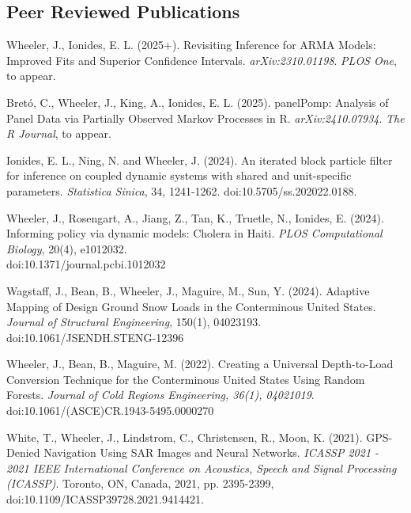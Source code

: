 \documentclass[11pt]{article}
\newenvironment {reflist}
                {
                 \begin{list}{}
                 {\setlength{\labelwidth}{0mm}
                  \setlength{\leftmargin}{8mm}
                  \setlength{\itemindent}{-3mm}
                  \setlength{\labelsep}{0mm}
                  \setlength{\parsep}{0.1 ex}
                  \setlength{\itemsep}{0.1cm}
      \setlength{\topsep}{0.15cm}}} %
   {\end{list}}
\begin{document}
\subsection*{Peer Reviewed Publications}

\begin{reflist}

    \item Wheeler, J., Ionides, E. L. (2025+). Revisiting Inference for ARMA Models: Improved Fits and Superior Confidence Intervals. {\it arXiv:2310.01198}. {\it PLOS One}, to appear.

    \item Bret\'o, C., Wheeler, J., King, A., Ionides, E. L. (2025). panelPomp: Analysis of Panel Data via Partially Observed Markov Processes in R. {\it arXiv:2410.07934}. {\it The R Journal}, to appear.

    \item Ionides, E. L., Ning, N. and Wheeler, J. (2024). An iterated block particle filter for inference on coupled dynamic systems with shared and unit-specific parameters. {\it Statistica Sinica}, 34, 1241-1262. doi:10.5705/ss.202022.0188.

    \item Wheeler, J., Rosengart, A., Jiang, Z., Tan, K., Truetle, N., Ionides, E. (2024). Informing policy via dynamic models: Cholera in Haiti. {\it PLOS Computational Biology}, 20(4), e1012032. \\ doi:10.1371/journal.pcbi.1012032

    \item Wagstaff, J., Bean, B., Wheeler, J., Maguire, M., Sun, Y. (2024). Adaptive Mapping of Design Ground Snow Loads in the Conterminous United States. {\it Journal of Structural Engineering}, 150(1), 04023193. doi:10.1061/JSENDH.STENG-12396

    \item Wheeler, J., Bean, B., Maguire, M. (2022). Creating a Universal Depth-to-Load Conversion Technique for the Conterminous United States Using Random Forests. {\it Journal of Cold Regions Engineering, 36(1), 04021019}. doi:10.1061/(ASCE)CR.1943-5495.0000270

    \item White, T., Wheeler, J., Lindstrom, C., Christensen, R., Moon, K. (2021). GPS-Denied Navigation Using SAR Images and Neural Networks. {\it ICASSP 2021 - 2021 IEEE International Conference on Acoustics, Speech and Signal Processing (ICASSP)}. Toronto, ON, Canada, 2021, pp. 2395-2399, doi:10.1109/ICASSP39728.2021.9414421.

\end{reflist}
\end{document}
